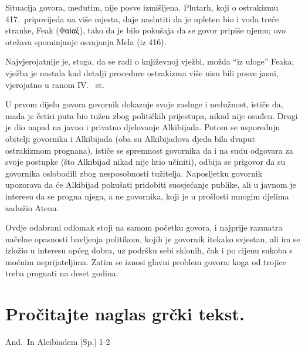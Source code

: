 Situacija govora, međutim, nije posve izmišljena. Plutarh, koji o ostrakizmu 417.\ pripovijeda na više mjesta, daje naslutiti da je upleten bio i vođa treće stranke, Feak \textgreek[variant=ancient]{(Φαίαξ),} tako da je bilo pokušaja da se govor pripiše njemu; ovo otežava spominjanje osvajanja Mela (iz 416). 

Najvjerojatnije je, stoga, da se radi o književnoj vježbi, možda ``iz uloge'' Feaka; vježba je nastala kad detalji procedure ostrakizma više nisu bili posve jasni, vjerojatno u ranom IV.~ st.

U prvom dijelu govora govornik dokazuje svoje zasluge i nedužnost, ističe da, mada je četiri puta bio tužen zbog političkih prijestupa, nikad nije osuđen. Drugi je dio napad na javno i privatno djelovanje Alkibijada. Potom se uspoređuju obitelji govornika i Alkibijada (oba su Alkibijadova djeda bila dvaput ostrakizmom prognana), ističe se spremnost govornika da i na sudu odgovara za svoje postupke (što Alkibijad nikad nije htio učiniti), odbija se prigovor da su govornika oslobodili zbog nesposobnosti tužitelja. Naposljetku govornik upozorava da će Alkibijad pokušati pridobiti suosjećanje publike, ali u javnom je interesu da se progna njega, a ne govornika, koji je u prošlosti mnogim djelima zadužio Atenu.

Ovdje odabrani odlomak stoji na samom početku govora, i najprije razmatra načelne opasnosti bavljenja politikom, kojih je govornik itekako svjestan, ali im se izložio u interesu općeg dobra, uz podršku sebi sklonih, čak i po cijenu sukoba s moćnim neprijateljima. Zatim se iznosi glavni problem govora: koga od trojice treba prognati na deset godina.

\newpage

\section*{Pročitajte naglas grčki tekst.}

And.\ In Alcibiadem [Sp.] 1-2


\medskip


